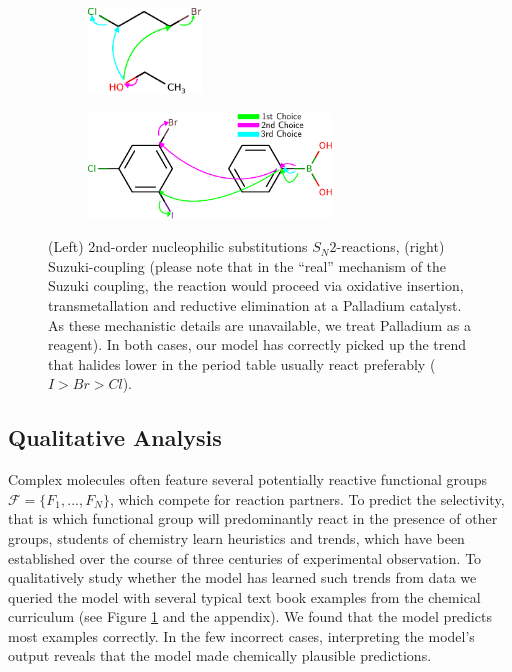 
\begin{figure}[t]

    \centering
    \begin{subfigure}[b]{0.3\textwidth}
        \centering
        \includegraphics[height=0.9in]{imgs/textbook/reaction3}\\\vspace{0.1in}
    \end{subfigure}%
    \hspace{1cm}
     \begin{subfigure}[b]{0.5\textwidth}
        \centering
        \includegraphics[height=1.1in]{imgs/textbook/reaction7}
    \end{subfigure}
	\caption{(Left) 2nd-order nucleophilic substitutions $S_N 2$-reactions, (right) Suzuki-coupling (please note that in the ``real'' mechanism of the Suzuki coupling, the reaction would proceed via oxidative insertion, transmetallation and reductive elimination at a Palladium catalyst. As these mechanistic details are unavailable, we treat Palladium as a reagent). 
    In both cases, our model has correctly picked up the trend that halides lower in the period table usually react preferably ($I>Br>Cl$). }
	\label{fig:qualitative}
\vspace{-0.5em}
\end{figure}



\subsection{Qualitative Analysis}

Complex molecules often feature several potentially reactive functional groups $\mathcal{F}=\{F_1,...,F_N\}$, which compete for reaction partners. 
To predict the selectivity, that is which functional group will predominantly react in the presence of other groups, 
students of chemistry learn heuristics and trends, 
which have been established over the course of three centuries of experimental observation.
To qualitatively study whether the model has learned such trends from data we queried the model with several typical text book examples from the chemical curriculum (see Figure \ref{fig:qualitative} and the appendix). 
We found that the model predicts most examples correctly. In the few incorrect cases, interpreting the model's output reveals that the model made chemically plausible predictions.

